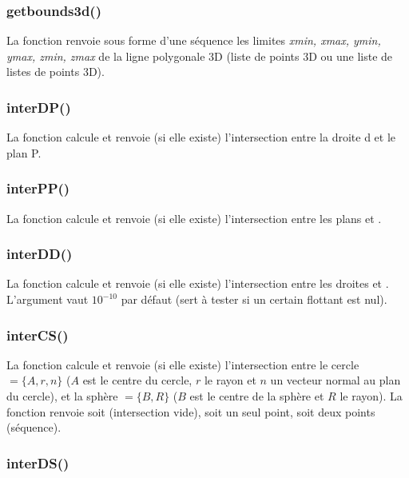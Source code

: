 \subsubsection{getbounds3d()}

La fonction  renvoie sous forme d'une séquence les limites \emph{xmin, xmax, ymin, ymax, zmin, zmax} de la ligne polygonale 3D  (liste de points 3D ou une liste de listes de points 3D).

\subsubsection{interDP()}

La fonction  calcule et renvoie (si elle existe) l'intersection entre la droite \argu d et le plan \argu P.

\subsubsection{interPP()}

La fonction  calcule et renvoie (si elle existe) l'intersection entre les plans  et .

\subsubsection{interDD()}

La fonction  calcule et renvoie (si elle existe) l'intersection entre les droites  et . L'argument  vaut $10^{-10}$ par défaut (sert à tester si un certain flottant est nul).

\subsubsection{interCS()}

La fonction  calcule et renvoie (si elle existe) l'intersection entre le cercle $=\{A,r,n\}$ ($A$ est le centre du cercle, $r$ le rayon et $n$ un vecteur normal au plan du cercle), et la sphère $=\{B,R\}$ ($B$ est le centre de la sphère et $R$ le rayon). La fonction renvoie soit \nil (intersection vide), soit un seul point, soit deux points (séquence).

\subsubsection{interDS()}

